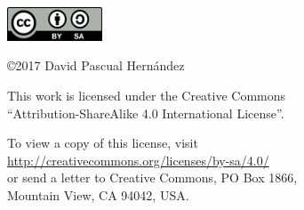 \pagebreak
\thispagestyle{empty}
\vspace*{12cm}

\begin{flushright}

\includegraphics[height=1.0cm]{figures/CC-BY-SA.png}

\vspace*{0.5cm}

\copyright 2017 David Pascual Hernández

\vspace*{0.3cm}

This work is licensed under the Creative Commons \\
``Attribution-ShareAlike 4.0 International License''.

\vspace{0.2cm}

To view a copy of this license, visit \\
\url{http://creativecommons.org/licenses/by-sa/4.0/} \\
or send a letter to Creative Commons, PO Box 1866, \\ Mountain View, CA 94042, USA.

\end{flushright}